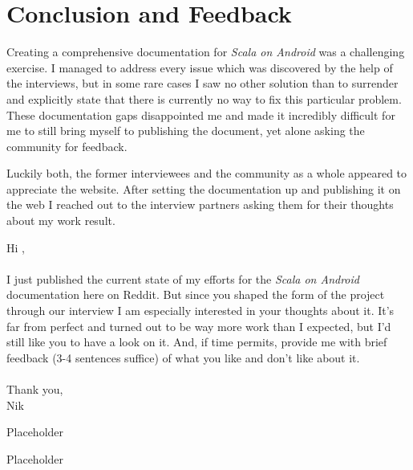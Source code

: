 \section{Conclusion and Feedback}

Creating a comprehensive documentation for \textit{Scala on Android} was a challenging exercise. I managed to address every issue which was discovered by the help of the interviews, but in some rare cases I saw no other solution than to surrender and explicitly state that there is currently no way to fix this particular problem. These documentation gaps disappointed me and made it incredibly difficult for me to still bring myself to publishing the document, yet alone asking the community for feedback.

Luckily both, the former interviewees and the community as a whole appeared to appreciate the website. After setting the documentation up and publishing it on the web I reached out to the interview partners asking them for their thoughts about my work result.

\begin{displayquote}

	Hi \underline{\hspace{2cm}},\\\\

	I just published the current state of my efforts for the \textit{Scala on Android} documentation here on Reddit. But since you shaped the form of the project through our interview I am especially interested in your thoughts about it.
	It's far from perfect and turned out to be way more work than I expected, but I'd still like you to have a look on it. And, if time permits, provide me with brief feedback (3-4 sentences suffice) of what you like and don't like about it.\\\\
	Thank you,\\
	Nik

\end{displayquote}

\hrulefill

\begin{displayquote}

	Placeholder

\end{displayquote}

\hrulefill

\begin{displayquote}

	Placeholder

\end{displayquote}

